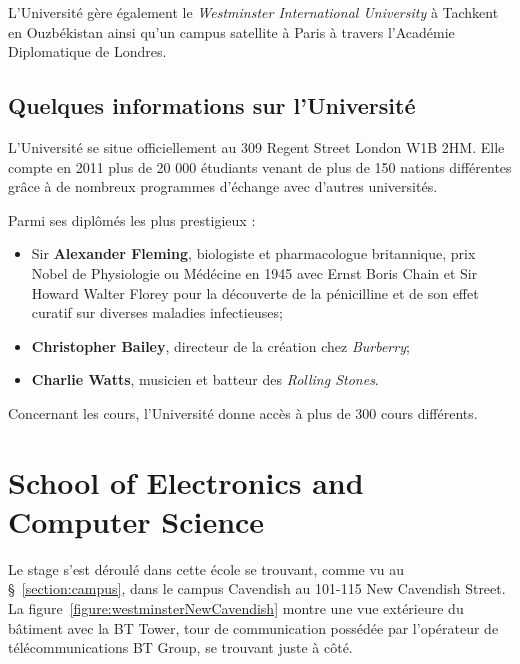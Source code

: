 \vspace{0.20cm}

L'Universit\'e g\`ere \'egalement le \textit{Westminster International University} \`a Tachkent en Ouzb\'ekistan ainsi qu'un campus satellite \`a Paris \`a travers l'Acad\'emie Diplomatique de Londres.

\subsection{Quelques informations sur l'Universit\'e}

L'Universit\'e se situe officiellement au 309 Regent Street London W1B 2HM.
Elle compte en 2011 plus de 20 000 \'etudiants venant de plus de 150 nations diff\'erentes gr\^ace \`a de nombreux programmes d'\'echange avec d'autres universit\'es.

\noindent Parmi ses dipl\^om\'es les plus prestigieux :

\begin{itemize}
	\item Sir \textbf{Alexander Fleming}, biologiste et pharmacologue britannique, prix Nobel de Physiologie ou M\'ed\'ecine en 1945 avec Ernst Boris Chain et Sir Howard Walter Florey pour la d\'ecouverte de la p\'enicilline et de son effet curatif sur diverses maladies infectieuses;
	\item \textbf{Christopher Bailey}, directeur de la cr\'eation chez \textit{Burberry};
	\item \textbf{Charlie Watts}, musicien et batteur des \textit{Rolling Stones}.

\end{itemize}

\vspace{0.20cm}

\noindent Concernant les cours, l'Universit\'e donne acc\`es \`a plus de 300 cours diff\'erents.

\section{School of Electronics and Computer Science}

Le stage s'est d\'eroul\'e dans cette \'ecole se trouvant, comme vu au \S~\ref{section:campus}, dans le campus Cavendish au 101-115 New Cavendish Street. 
La figure~\ref{figure:westminsterNewCavendish} montre une vue ext\'erieure du b\^atiment avec la BT Tower, tour de communication poss\'ed\'ee par l'op\'erateur de t\'el\'ecommunications BT Group, se trouvant juste \`a c\^ot\'e.

